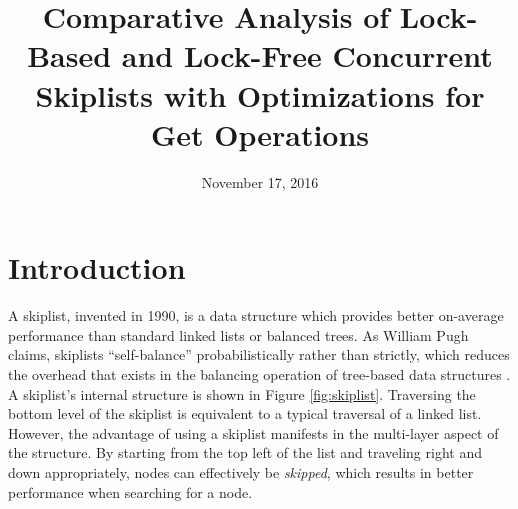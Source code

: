 \documentclass[12pt,oneline,a4paper]{ouparticle}
\begin{document}
\title{Comparative Analysis of Lock-Based and Lock-Free Concurrent Skiplists with Optimizations for {Get} Operations}


\author{%
\address{The University of Texas at Austin, Austin, TX}
}


\date{November 17, 2016}


\maketitle

\section{Introduction}
\label{sec1}

A skiplist, invented in 1990, is a data structure which provides better on-average performance than standard linked lists or balanced trees. As William Pugh claims, skiplists “self-balance” probabilistically rather than strictly, which reduces the overhead that exists in the balancing operation of tree-based data structures \cite{pugh1} \cite{pugh2}. A skiplist's internal structure is shown in Figure \ref{fig:skiplist}. Traversing the bottom level of the skiplist is equivalent to a typical traversal of a linked list. However, the advantage of using a skiplist manifests in the multi-layer aspect of the structure. By starting from the top left of the list and traveling right and down appropriately, nodes can effectively be {\it skipped}, which results in better performance when searching for a node.
\end{document}
